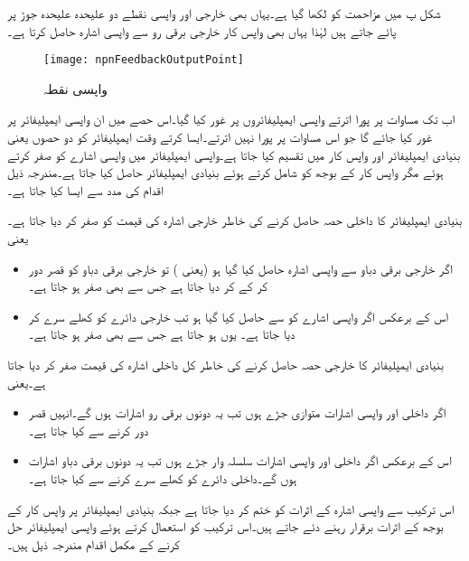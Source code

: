 شکل  پ میں مزاحمت  کو  لکھا گیا ہے۔یہاں بھی خارجی اور واپسی نقطے دو علیحدہ علیحدہ جوڑ پر پائے جاتے ہیں لہٰذا یہاں بھی واپس کار خارجی برقی رو  سے واپسی اشارہ حاصل کرتا ہے۔
\begin{figure}
\centering
\texttt{[image: npnFeedbackOutputPoint]}
\caption{واپسی نقطہ}
\label{شکل_واپسی_ٹرانزسٹر_واپسی_نقطہ}
\end{figure}


 \label{حصہ_واپسی_تفصیلی_تجزیہ}
اب تک مساوات  پر پورا اترتے واپسی ایمپلیفائروں پر غور کیا گیا۔اس حصے میں ان واپسی ایمپلیفائر پر غور کیا جائے گا جو اس مساوات پر پورا نہیں اترتے۔ایسا کرتے وقت ایمپلیفائر کو دو حصوں یعنی بنیادی ایمپلیفائر  اور واپس کار   میں تقسیم کیا جاتا ہے۔واپسی ایمپلیفائر میں واپسی اشارے کو صفر کرتے ہوئے مگر واپس کار کے بوجھ کو شامل کرتے ہوئے بنیادی ایمپلیفائر حاصل کیا جاتا ہے۔مندرجہ ذیل اقدام کی مدد سے ایسا کیا جاتا ہے۔

بنیادی ایمپلیفائر کا داخلی حصہ حاصل کرنے کی خاطر خارجی اشارہ  کی قیمت کو صفر کر دیا جاتا ہے۔یعنی
\begin{itemize}
\item
اگر خارجی برقی دباو  سے واپسی اشارہ حاصل کیا گیا ہو (یعنی ) تو خارجی برقی دباو کو قصر دور کر کے  کر دیا جاتا ہے جس سے  بھی صفر ہو جاتا ہے۔
\item
اس کے برعکس اگر واپسی اشارے کو  سے حاصل کیا گیا ہو تب خارجی دائرے کو کھلے سرے کر دیا جاتا ہے۔ یوں  ہو جاتا ہے جس سے  بھی صفر ہو جاتا ہے۔
\end{itemize} 


بنیادی ایمپلیفائر کا خارجی حصہ حاصل کرنے کی خاطر کل داخلی اشارہ  کی قیمت صفر کر دیا جاتا ہے۔یعنی
\begin{itemize}
\item
اگر داخلی اور واپسی اشارات متوازی جڑے ہوں تب یہ دونوں برقی رو اشارات ہوں گے۔انہیں قصر دور کرنے سے  کیا جاتا ہے۔
\item
اس کے برعکس اگر داخلی اور واپسی اشارات سلسلہ وار جڑے ہوں تب یہ دونوں برقی دباو اشارات ہوں گے۔داخلی دائرے کو کھلے سرے کرنے سے  کیا جاتا ہے۔
\end{itemize} 
اس ترکیب سے واپسی اشارہ کے اثرات کو ختم کر دیا جاتا ہے جبکہ بنیادی ایمپلیفائر پر واپس کار کے بوجھ کے اثرات برقرار رہنے دئے جاتے ہیں۔اس ترکیب کو استعمال کرتے ہوئے واپسی ایمپلیفائر حل کرنے کے مکمل اقدام مندرجہ ذیل ہیں۔


